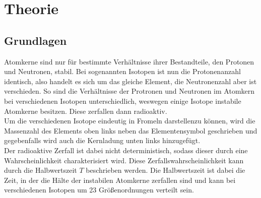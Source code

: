 \section{Theorie}
\label{sec:Theorie}
\subsection{Grundlagen}
\label{sec:Grundlagen}
Atomkerne sind nur für bestimmte Verhältnisse ihrer Bestandteile, den Protonen und Neutronen, stabil.
Bei sogenannten Isotopen ist nun die Protonenanzahl identisch, also handelt es sich um das gleiche 
Element, die Neutronenzahl aber ist verschieden. So sind die Verhältnisse der Protronen und Neutronen
im Atomkern bei verschiedenen Isotopen unterschiedlich, weswegen einige Isotope instabile Atomkerne
besitzen. Diese zerfallen dann radioaktiv.\\
Um die verschiedenen Isotope eindeutig in Fromeln darstellenzu können, wird die Massenzahl des Elements
oben links neben das Elementensymbol geschrieben und gegebenfalls wird auch die Kernladung unten links 
hinzugefügt.\\
Der radioaktive Zerfall ist dabei nicht deterministisch, sodass dieser durch eine Wahrscheinlichkeit 
charakterisiert wird. Diese Zerfallswahrscheinlichkeit kann durch die Halbwertszeit $T$ beschrieben 
werden. Die Halbwertszeit ist dabei die Zeit, in der die Hälte der instabilen Atomkerne zerfallen sind
und kann bei verschiedenen Isotopen um 23 Größenordnungen verteilt sein.\\
